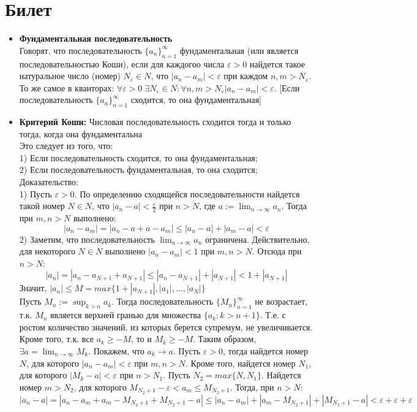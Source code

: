 \documentclass[12pt,a4paper]{article}
\begin{document}
\section{Билет}
\begin{itemize}

\item \textbf{Фундаментальная последовательность} \\
Говорят, что последовательность $\{a_n\}_{n=1}^{\infty}$ фундаментальная (или является последовательностью Коши), если для каждогоо числа $\varepsilon > 0$ найдется такое натуральное число (номер) $N_{\varepsilon} \in N$, что $|a_n - a_m| < \varepsilon$ при каждом $n, m > N_{\varepsilon}$. То же самое в кванторах: $\forall \varepsilon > 0 \; \exists N_{\varepsilon} \in N: \forall n, m > N_{\varepsilon} |a_n - a_m| < \varepsilon$.
[Если последовательность $\{a_n\}_{n=1}^{\infty}$ сходится, то она фундаментальная]

\item \textbf{Критерий Коши: }Числовая последовательность сходится тогда и только тогда, когда она фундаментальна \\
Это следует из того, что: \\
1) Если последовательность сходится, то она фундаментальная; \\
2) Если последовательность фундаментальная, то она сходится; \\
Доказательство: \\
1) Пусть $\varepsilon > 0$. По определению сходящейся последовательности найдется такой номер $N \in N$, что $|a_n - a| < \frac{\varepsilon}{2}$ при $n > N$, где $a := \lim_{n \to \infty}{a_n}$. Тогда при $m, n > N$ выполнено:
\[
|a_n - a_m| = |a_n - a + a - a_m| \leq |a_n - a| + |a_m - a| < \varepsilon
\]
2) Заметим, что последовательность $\lim_{n \to \infty}{a_n}$ ограничена. Действительно, для некоторого $N \in N$ выполнено $|a_n - a_m| < 1$ при $m, n > N$. Отсюда при $n > N$:
\[
|a_n| = |a_n - a_{N+1} + a_{N+1}| \leq |a_n - a_{N+1}| + |a_{N+1}| < 1 + |a_{N+1}|
\]
Значит, $|a_n| \leq M = max\{1 + |a_{N+1}|,|a_1|, ..., |a_N|\}$ \\
Пусть $M_n := \sup_{k > n}{a_k}$. Тогда последовательность $\{M_n\}_{n=1}^{\infty}$ не возрастает, т.к. $M_n$ является верхней гранью для множества $\{a_k: k > n+1\}$. Т.е. с ростом количество значений, из которых берется супремум, не увеличивается. Кроме того, т.к. все $a_k \geq -M$, то и $M_k \geq -M$. Таким образом, $\exists a = \lim_{n \to \infty}{M_k}$. Покажем, что $a_k \longrightarrow a$. Пусть $\varepsilon > 0$, тогда найдется номер $N$, для которого $|a_n - a_m| < \varepsilon$ при $m, n > N$. Кроме того, найдется номер $N_1$, для которого $|M_k - a| < \varepsilon$ при $n > N_1$. Пусть $N_2 = max\{N, N_1\}$. Найдется номер $m > N_2$, для которого $M_{N_2+1} - \varepsilon < a_m \leq M_{N_2+1}$. Тогда, при $n > N$: \\
$|a_n - a| = |a_n - a_m + a_m - M_{N_2+1} + M_{N_2+1} - a| \leq |a_n - a_m| + |a_m - M_{N_2+1}| + |M_{N_2+1} - a| < \varepsilon + \varepsilon + \varepsilon$


\end{itemize}
\end{document}
